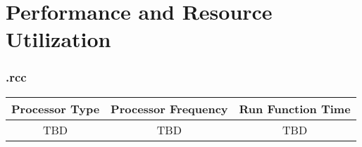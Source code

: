 \section*{Performance and Resource Utilization}
\subsubsection*{\comp.rcc}
\begin{scriptsize}
	\begin{tabular}{|c|c|c|}
		\hline
		\rowcolor{blue}
		Processor Type & Processor Frequency & Run Function Time \\
		\hline
		TBD            & TBD                 & TBD               \\
		\hline
	\end{tabular}
\end{scriptsize}

